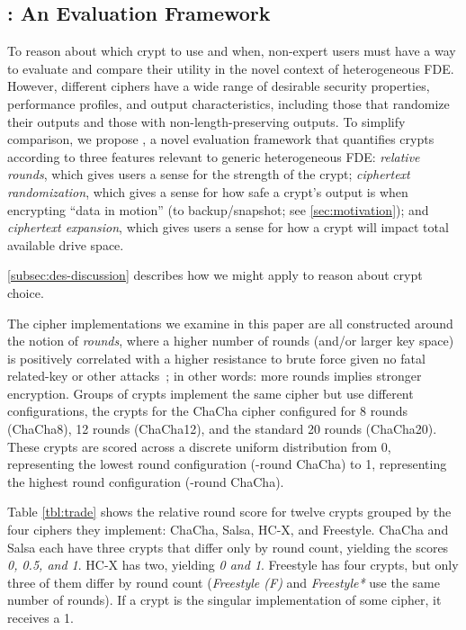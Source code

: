 \subsection{\sysC: An Evaluation Framework}\label{subsec:des-trade}

To reason about which crypt to use and when, non-expert users must have a way to
evaluate and compare their utility in the novel context of heterogeneous FDE.
However, different ciphers have a wide range of desirable security properties,
performance profiles, and output characteristics, including those that randomize
their outputs and those with non-length-preserving outputs. To simplify
comparison, we propose \sysC, a novel evaluation framework that quantifies
crypts according to three features relevant to generic heterogeneous FDE: {\em
relative rounds}, which gives users a sense for the strength of the crypt; {\em
ciphertext randomization}, which gives a sense for how safe a crypt's output is
when encrypting ``data in motion'' (\eg to backup/snapshot; see
\cref{sec:motivation}); and {\em ciphertext expansion}, which gives users a
sense for how a crypt will impact total available drive space.

\cref{subsec:des-discussion} describes how we might apply \sysC to reason about
crypt choice.




 The cipher implementations we examine in this
paper are all constructed around the notion of {\em rounds}, where a higher
number of rounds (and/or larger key space) is positively correlated with a
higher resistance to brute force given no fatal related-key or other
attacks~\cite{ChaCha-Cryptanalysis}; in other words: more rounds implies
stronger encryption. Groups of crypts implement the same cipher but use
different configurations, \eg the crypts for the ChaCha cipher configured for 8
rounds (ChaCha8), 12 rounds (ChaCha12), and the standard 20 rounds (ChaCha20).
These crypts are scored across a discrete uniform distribution from 0,
representing the lowest round configuration (-round ChaCha) to 1,
representing the highest round configuration (-round ChaCha).

Table \cref{tbl:trade} shows the relative round score for twelve crypts grouped
by the four ciphers they implement: ChaCha, Salsa, HC-X, and Freestyle. ChaCha
and Salsa each have three crypts that differ only by round count, yielding the
scores {\em 0, 0.5, and 1}. HC-X has two, yielding {\em 0 and 1}. Freestyle has
four crypts, but only three of them differ by round count ({\em Freestyle (F)}
and {\em Freestyle*} use the same number of rounds). If a crypt is the singular
implementation of some cipher, it receives a 1.

